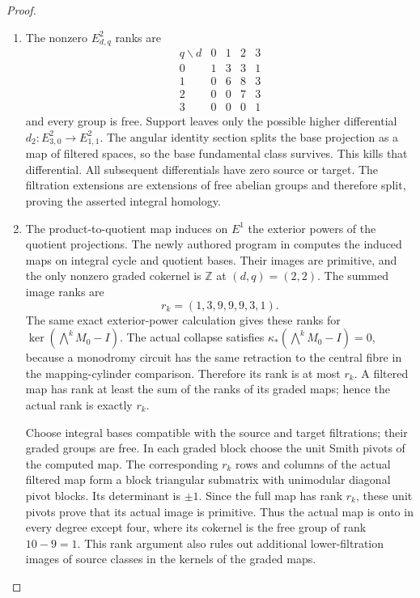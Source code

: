 \begin{proof}
\begin{enumerate}[label=\arabic*.]
\item The nonzero $E^2_{d,q}$ ranks are
\[
\begin{array}{c|rrrr}
q\backslash d&0&1&2&3\\\hline
0&1&3&3&1\\
1&0&6&8&3\\
2&0&0&7&3\\
3&0&0&0&1
\end{array}
\]
and every group is free.  Support leaves only the possible higher
differential $d_2:E^2_{3,0}\to E^2_{1,1}$.
The angular identity section splits the base projection as a map of
filtered spaces, so the base fundamental class survives.  This kills
that differential.  All subsequent differentials have zero source or
target.  The filtration extensions are extensions of free abelian
groups and therefore split, proving the asserted integral homology.

\item The product-to-quotient map induces on $E^1$ the exterior powers of
the quotient projections.  The newly authored program
 in 
computes the induced maps on integral cycle and quotient bases.
Their images are primitive, and the only nonzero graded cokernel
is $\mathbb Z$ at $(d,q)=(2,2)$.  The summed image ranks are
\[
             r_k=(1,3,9,9,9,3,1).
\]
The same exact exterior-power calculation gives these ranks for
$\ker(\bigwedge^kM_0-I)$.
The actual collapse satisfies
$\kappa_*(\bigwedge^kM_0-I)=0$, because a monodromy circuit
has the same retraction to the central fibre in the mapping-cylinder
comparison.  Therefore its rank is at most $r_k$.
A filtered map has rank at least the sum of the ranks of its
graded maps; hence the actual rank is exactly $r_k$.

Choose integral bases compatible with the source and target
filtrations; their graded groups are free.  In each graded block
choose the unit Smith pivots of the computed map.  The corresponding
$r_k$ rows and columns of the actual filtered map form a block
triangular submatrix with unimodular diagonal pivot blocks.
Its determinant is $\pm1$.  Since the full map has rank $r_k$,
these unit pivots prove that its actual image is primitive.
Thus the actual map is onto in every degree except four, where its
cokernel is the free group of rank $10-9=1$.
This rank argument also rules out additional lower-filtration images
of source classes in the kernels of the graded maps.


\end{enumerate}
\end{proof}
